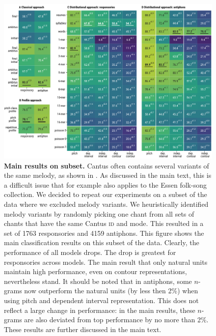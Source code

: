 \documentclass{article}
\begin{document}
\begin{figure}
    \centering
    \includegraphics{figs/figS13-subset-results-stddev.pdf}
    \caption{
        \textbf{Main results on subset.}
        Cantus often contains several variants of the same melody, as shown in .
        As discussed in the main text, this is a difficult issue that for example also applies to the Essen folk-song collection.
        We decided to repeat our experiments on a subset of the data where we excluded melody variants.
        We heuristically identified melody variants by randomly picking one chant from all sets of chants that have the same Cantus \textsc{id} and mode.
        This resulted in a set of 1763 responsories and 4159 antiphons.
        This figure shows the main classification results on this subset of the data.
        Clearly, the performance of all models drops.
        The drop is greatest for responsories across models. 
        The main result that only natural units maintain high performance, even on contour representations, nevertheless stand.
        It should be noted that in antiphons, some $n$-grams now outperform the natural units (by less then 2\%) when using pitch and dependent interval representation.
        This does not reflect a large change in performance: in the main results, these $n$-grams are also deviated from top performance by no more than 2\%.
        These results are further discussed in the main text.
        \label{suppl:results-subset}
    }
\end{figure}
\end{document}
